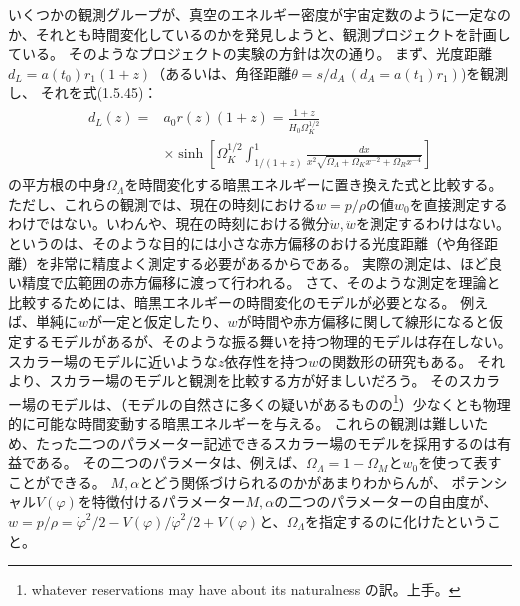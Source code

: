 \documentclass[11pt]{ltjsarticle}
\theoremstyle{plain}
\theoremstyle{break}
\begin{document}
いくつかの観測グループが、真空のエネルギー密度が宇宙定数のように一定なのか、それとも時間変化しているのかを発見しようと、観測プロジェクトを計画している。
そのようなプロジェクトの実験の方針は次の通り。
まず、光度距離$d_{L}=a\left(t_{0}\right) r_{1}(1+z)$（あるいは、角径距離$\theta=s / d_{A} \,(d_{A}=a\left(t_{1}\right) r_{1})$)を観測し、
それを式(1.5.45)：
\begin{align}
  \begin{aligned} d_{L}(z)=& a_{0} r(z)(1+z)=\frac{1+z}{H_{0} \Omega_{K}^{1 / 2}} \\ & \times \sinh \left[\Omega_{K}^{1 / 2} \int_{1 /(1+z)}^{1} \frac{d x}{x^{2} \sqrt{\Omega_{\Lambda}+\Omega_{K} x^{-2}+\Omega_{R} x^{-4}}}\right] \end{aligned}
\end{align}%
の平方根の中身$\Omega_\Lambda$を時間変化する暗黒エネルギーに置き換えた式と比較する。
ただし、これらの観測では、現在の時刻における$w = p/\rho$の値$w_0$を直接測定するわけではない。いわんや、現在の時刻における微分$\dot{w},\ddot{w}$を測定するわけはない。
というのは、そのような目的には小さな赤方偏移のおける光度距離（や角径距離）を非常に精度よく測定する必要があるからである。
実際の測定は、ほど良い精度で広範囲の赤方偏移に渡って行われる。
さて、そのような測定を理論と比較するためには、暗黒エネルギーの時間変化のモデルが必要となる。
例えば、単純に$w$が一定と仮定したり、$w$が時間や赤方偏移に関して線形になると仮定するモデルがあるが、そのような振る舞いを持つ物理的モデルは存在しない。
スカラー場のモデルに近いような$z$依存性を持つ$w$の関数形の研究もある。
それより、スカラー場のモデルと観測を比較する方が好ましいだろう。
そのスカラー場のモデルは、（モデルの自然さに多くの疑いがあるものの\footnote{whatever reservations may have about its naturalness の訳。上手。}）少なくとも物理的に可能な時間変動する暗黒エネルギーを与える。
これらの観測は難しいため、たった二つのパラメーター記述できるスカラー場のモデルを採用するのは有益である。
その二つのパラメータは、例えば、$\Omega_{\Lambda} = 1- \Omega_{M}$と$w_0$を使って表すことができる。
$M,\alpha$とどう関係づけられるのかがあまりわからんが、
ポテンシャル$V(\varphi)$を特徴付けるパラメーター$M,\alpha$の二つのパラメーターの自由度が、$w = p/\rho={\dot{\varphi}^2/2 - V(\varphi)}/{\dot{\varphi}^2/2 + V(\varphi)}$と、$\Omega_\Lambda $を指定するのに化けたということ。
\end{document}
